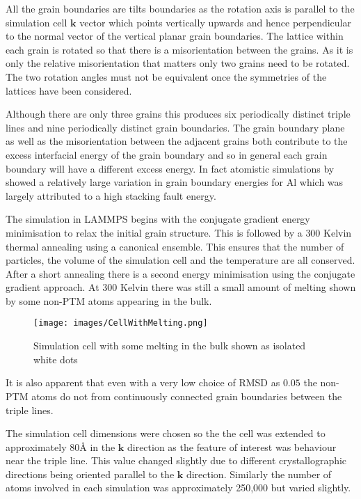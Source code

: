 \documentclass[12pt,a4paper,openany]{report}
\begin{document}
All the grain boundaries are tilts boundaries as the rotation axis is parallel to the simulation cell $\mathbf{k}$ vector which points vertically upwards and hence perpendicular to the normal vector of the vertical planar grain boundaries. The lattice within each grain is rotated so that there is a misorientation between the grains. As it is only the relative misorientation that matters only two grains need to be rotated. The two rotation angles must not be equivalent once the symmetries of the lattices have been considered. 

Although there are only three grains this produces six periodically distinct triple lines and nine periodically distinct grain boundaries. The grain boundary plane as well as the misorientation between the adjacent grains both contribute to the excess interfacial energy of the grain boundary and so in general each grain boundary will have a different excess energy. In fact atomistic simulations by \cite{HOLM2010905} showed a relatively large variation in grain boundary energies for Al which was largely attributed to a high stacking fault energy. 

The simulation in LAMMPS begins with the conjugate gradient energy minimisation to relax the initial grain structure. This is followed by a $300$ Kelvin thermal annealing using a canonical ensemble. This ensures that the number of particles, the volume of the simulation cell and the temperature are all conserved. After a short annealing there is a second energy minimisation using the conjugate gradient approach. At $300$ Kelvin there was still a small amount of melting shown by some non-PTM atoms appearing in the bulk. 

\begin{figure}[H]
	\centering
	\texttt{[image: images/CellWithMelting.png]} 
	\label{fig:CellMelt}
	\caption{Simulation cell with some melting in the bulk shown
	as isolated white dots}
\end{figure}

It is also apparent that even with a very low choice of RMSD as $0.05$ the non-PTM atoms do not from continuously connected grain boundaries between the triple lines.

The simulation cell dimensions were chosen so the the cell was extended to approximately $80 \textrm{\AA}$ in the $\mathbf{k}$ direction as the feature of interest was behaviour near the triple line. This value changed slightly due to different crystallographic directions being oriented parallel to the $\mathbf{k}$ direction. Similarly the number of atoms involved in each simulation was approximately 250,000 but varied slightly.  
\end{document}
